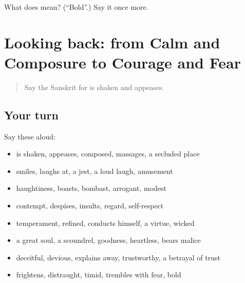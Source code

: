 \begin{tcolorbox}[breakable,colback=teal!4,colframe=teal!35!black,title={Before you move on}]
What does  mean? (\textquotedblleft{}Bold\textquotedblright{}.) Say it once more.
\end{tcolorbox}
\section[(dialogue)]{Looking back: from Calm and Composure to Courage and Fear}

\label{lesson:SA-R463-review-456-463}



\begin{quote}
Say the Sanskrit for is shaken and appeases.
\end{quote}

\subsection*{Your turn}
Say these aloud:

\begin{itemize}
\raggedright
  \item is shaken, appeases, composed, massages, a secluded place
  \item smiles, laughs at, a jest, a loud laugh, amusement
  \item haughtiness, boasts, bombast, arrogant, modest
  \item contempt, despises, insults, regard, self-respect
  \item temperament, refined, conducts himself, a virtue, wicked
  \item a great soul, a scoundrel, goodness, heartless, bears malice
  \item deceitful, devious, explains away, trustworthy, a betrayal of trust
  \item frightens, distraught, timid, trembles with fear, bold
\end{itemize}

